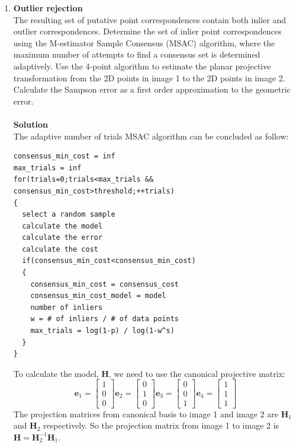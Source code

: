 \documentclass{../../assignment}
\begin{document}
\begin{problemlist}
\begin{enumerate}
\item \textbf{Outlier rejection}\\
The resulting set of putative point correspondences contain both inlier and outlier correspondences. Determine the set of inlier point correspondences using the M-estimator Sample Consensus (MSAC) algorithm, where the maximum number of attempts to find a consensus set is determined adaptively. Use the 4-point algorithm to estimate the planar projective transformation from the 2D points in image 1 to the 2D points in image 2. Calculate the Sampson error as a first order approximation to the geometric error.
\\\\
\textbf{Solution}\\
The adaptive number of trials MSAC algorithm can be concluded as follow:
\begin{lstlisting}
consensus_min_cost = inf
max_trials = inf
for(trials=0;trials<max_trials && consensus_min_cost>threshold;++trials)
{
  select a random sample
  calculate the model
  calculate the error
  calculate the cost
  if(consensus_min_cost<consensus_min_cost)
  {
    consensus_min_cost = consensus_cost
    consensus_min_cost_model = model
    number of inliers
    w = # of inliers / # of data points
    max_trials = log(1-p) / log(1-w^s)
  }
}
\end{lstlisting}
To calculate the model, $\mathbf{H}$, we need to use the canonical projective matrix:
\[
\mathbf{e}_1 = 
\begin{bmatrix}
1\\
0\\
0
\end{bmatrix}
\mathbf{e}_2 = 
\begin{bmatrix}
0\\
1\\
0
\end{bmatrix}
\mathbf{e}_3 = 
\begin{bmatrix}
0\\
0\\
1
\end{bmatrix}
\mathbf{e}_4 = 
\begin{bmatrix}
1\\
1\\
1
\end{bmatrix}
\]
The projection matrices from canonical basis to image 1 and image 2 are $\mathbf{H}_1$ and $\mathbf{H}_2$ respectively. So the projection matrix from image 1 to image 2 is $\mathbf{H} = \mathbf{H}_2^{-1}\mathbf{H}_1$.


\end{enumerate}
\end{problemlist}
\end{document}
